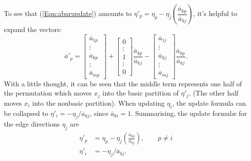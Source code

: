 To see that (\ref{Eqn:abarupdate}) amounts to
$\eta'_p = \eta_p - \eta_j( \dfrac{\overline{a}_{kp}}{\overline{a}_{kj}} )$,
it's helpful to expand the vectors:
\begin{equation*}
\overline{a}'_p =
  \begin{bmatrix} \overline{a}_{1p} \\ \vdots \\
		  \overline{a}_{kp} \\ \vdots \\
		  \overline{a}_{mp} \end{bmatrix} +
  \begin{bmatrix} 0 \\ \vdots \\
		  1 \\ \vdots \\
		  0 \end{bmatrix}\frac{\overline{a}_{kp}}{\overline{a}_{kj}} -
  \begin{bmatrix} \overline{a}_{1j} \\ \vdots \\
		  \overline{a}_{kj} \\ \vdots \\
		  \overline{a}_{mj} \end{bmatrix}
		  \frac{\overline{a}_{kp}}{\overline{a}_{kj}} .
\end{equation*}
With a little thought, it can be seen that the middle term represents one
half of the
permutation which moves $x_j$ into the basic partition of $\eta'_j$.
(The other half moves $x_i$ into the nonbasic partition).
When updating $\eta_i$, the update formula can be collapsed to
$\eta'_i = - \eta_j/\overline{a}_{kj}$, since $\overline{a}_{ki} = 1$.
Summarising, the update formul\ae{} for the edge directions $\eta_j$ are
\begin{equation}
\begin{split}
\eta'_p & = \eta_p - \eta_j( \frac{\overline{a}_{kp}}{\overline{a}_{kj}} ),
\qquad p \neq i \\
\eta'_i & = - \eta_j/\overline{a}_{kj}. \label{Eqn:etaupdate}
\end{split}
\end{equation}

